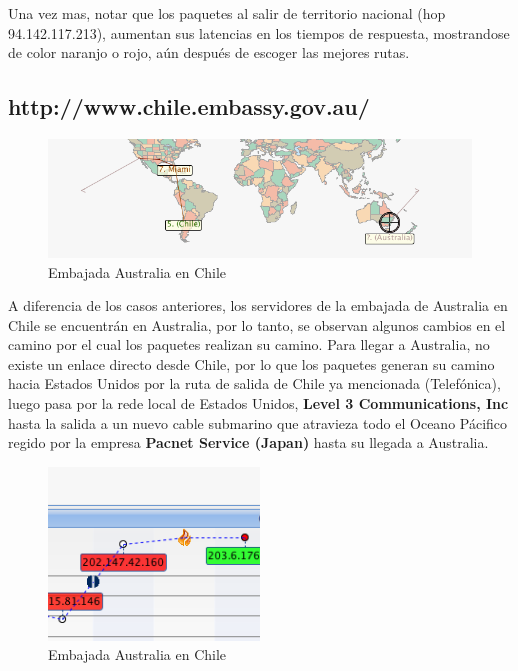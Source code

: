 \documentclass[a4papaer]{article}
\begin{document}
Una vez mas, notar que los paquetes al salir de territorio nacional (hop 94.142.117.213), aumentan sus latencias en los tiempos de respuesta, mostrandose de color naranjo o rojo, aún después de escoger las mejores rutas.

\pagebreak

\subsection{http://www.chile.embassy.gov.au/}

\begin{figure}[h]
  \centering
    \includegraphics[width=1\textwidth]{au1}
  \caption{Embajada Australia en Chile}
  \label{fig:Trace Route de http://www.chile.embassy.gov.au/}
\end{figure}

A diferencia de los casos anteriores, los servidores de la embajada de Australia en Chile se encuentrán en Australia, por lo tanto, se observan algunos cambios en el camino por el cual los paquetes realizan su camino. Para llegar a Australia, no existe un enlace directo desde Chile, por lo que los paquetes generan su camino hacia Estados Unidos por la ruta de salida de Chile ya mencionada (Telefónica), luego pasa por la rede local de Estados Unidos, \textbf{Level 3 Communications, Inc} hasta la salida a un nuevo cable submarino que atravieza todo el Oceano Pácifico regido por la empresa \textbf{Pacnet Service (Japan)} hasta su llegada a Australia.

\begin{figure}[h]
  \centering
    \includegraphics[width=0.5\textwidth]{au4}
  \caption{Embajada Australia en Chile}
  \label{fig:Trace Route de http://www.chile.embassy.gov.au/}
\end{figure}
\end{document}
